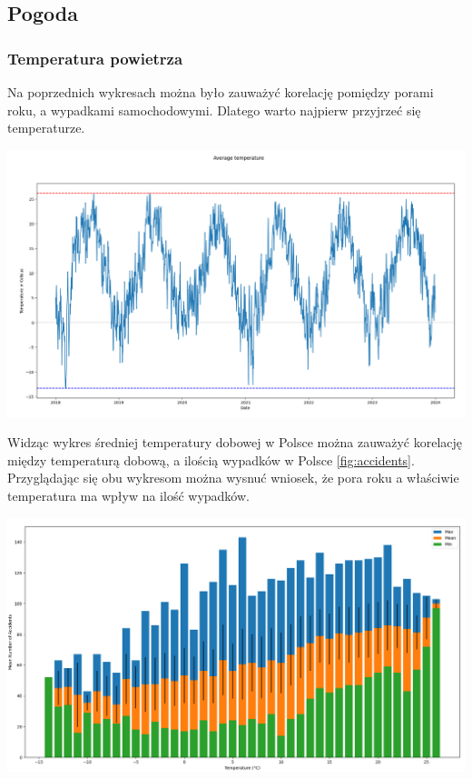 \documentclass{article}
\begin{document}
\subsection{Pogoda}
\subsubsection{Temperatura powietrza}
Na poprzednich wykresach można było zauważyć korelację pomiędzy porami roku, 
a wypadkami samochodowymi. Dlatego warto najpierw przyjrzeć się temperaturze.

 \begin{center}
    \includegraphics[scale=0.25]{visualization/avg_temp.png}
    \captionsetup{hypcap=false}
    \label{fig:avg_temp}
\end{center}

Widząc wykres średniej temperatury dobowej w Polsce można zauważyć korelację między temperaturą dobową, a ilością wypadków w Polsce \ref{fig:accidents}. Przyglądając się obu wykresom można wysnuć wniosek, że pora roku a właściwie temperatura ma wpływ na ilość wypadków. 

 \begin{center}
    \includegraphics[scale=0.3]{visualization/temp_vs_accidents.png}
    \captionsetup{hypcap=false}
    \label{fig:temp_vs_accidents}
\end{center}
\end{document}
